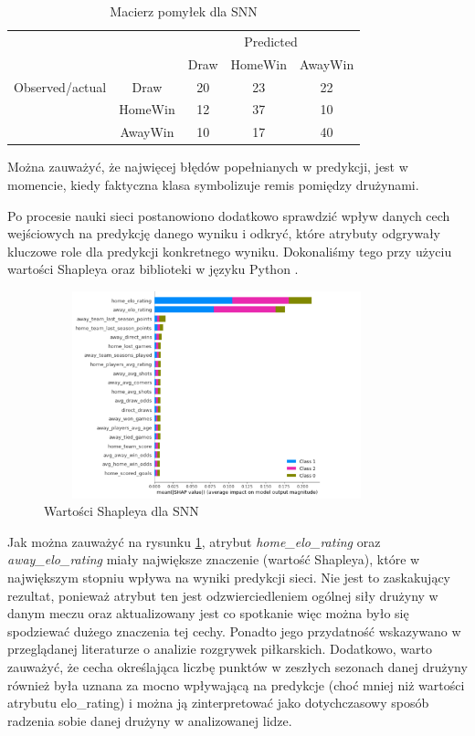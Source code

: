 \begin{center}
\begin{table}[H]
\renewcommand{\arraystretch}{1.5}
\caption{Macierz pomyłek dla SNN}
\label{tab:macierzSNN}
\begin{center}
\begin{tabular}{|c|c|c|c|c|}
   \cline{3-5} 
   \multicolumn{1}{c}{} & & \multicolumn{3}{c|}{Predicted} \\ \cline{3-5}
   \multicolumn{1}{c}{} & & Draw & HomeWin & AwayWin \\ \hline
   
   {Observed/actual}
   & Draw & 20 & 23 & 22 \\ \cline{2-5}
   & HomeWin & 12 & 37 & 10  \\ \cline{2-5}
   & AwayWin & 10 & 17 & 40 \\ \hline
\end{tabular}
\end{center}
\end{table}
\end{center}


Można zauważyć, że najwięcej błędów popełnianych w predykcji, jest w momencie, kiedy faktyczna klasa symbolizuje remis pomiędzy drużynami. 

Po procesie nauki sieci postanowiono dodatkowo sprawdzić wpływ danych cech wejściowych na predykcję danego wyniku i odkryć, które atrybuty odgrywały kluczowe role dla predykcji konkretnego wyniku. Dokonaliśmy tego przy użyciu wartości Shapleya \cite{shapley} oraz biblioteki w języku Python .
\begin{figure}[H] 
        \centering\includegraphics[width=10cm,height=6cm]{figures/ShapSNN.png}
        \caption{Wartości Shapleya dla SNN}\label{Shap-SNN}
\end{figure}

Jak można zauważyć na rysunku \ref{Shap-SNN}, atrybut \textit{home\_elo\_rating} oraz \textit{away\_elo\_rating} miały największe znaczenie (wartość Shapleya), które w największym stopniu wpływa na wyniki predykcji sieci. Nie jest to zaskakujący rezultat, ponieważ atrybut ten jest odzwierciedleniem ogólnej siły drużyny w danym meczu oraz aktualizowany jest co spotkanie więc można było się spodziewać dużego znaczenia tej cechy. Ponadto jego przydatność wskazywano w przeglądanej literaturze o analizie rozgrywek piłkarskich. Dodatkowo, warto zauważyć, że cecha określająca liczbę punktów w zeszłych sezonach danej drużyny również była uznana za mocno wpływającą na predykcje (choć  mniej niż wartości atrybutu elo\_rating) i można ją zinterpretować jako dotychczasowy sposób radzenia sobie danej drużyny w analizowanej lidze.


